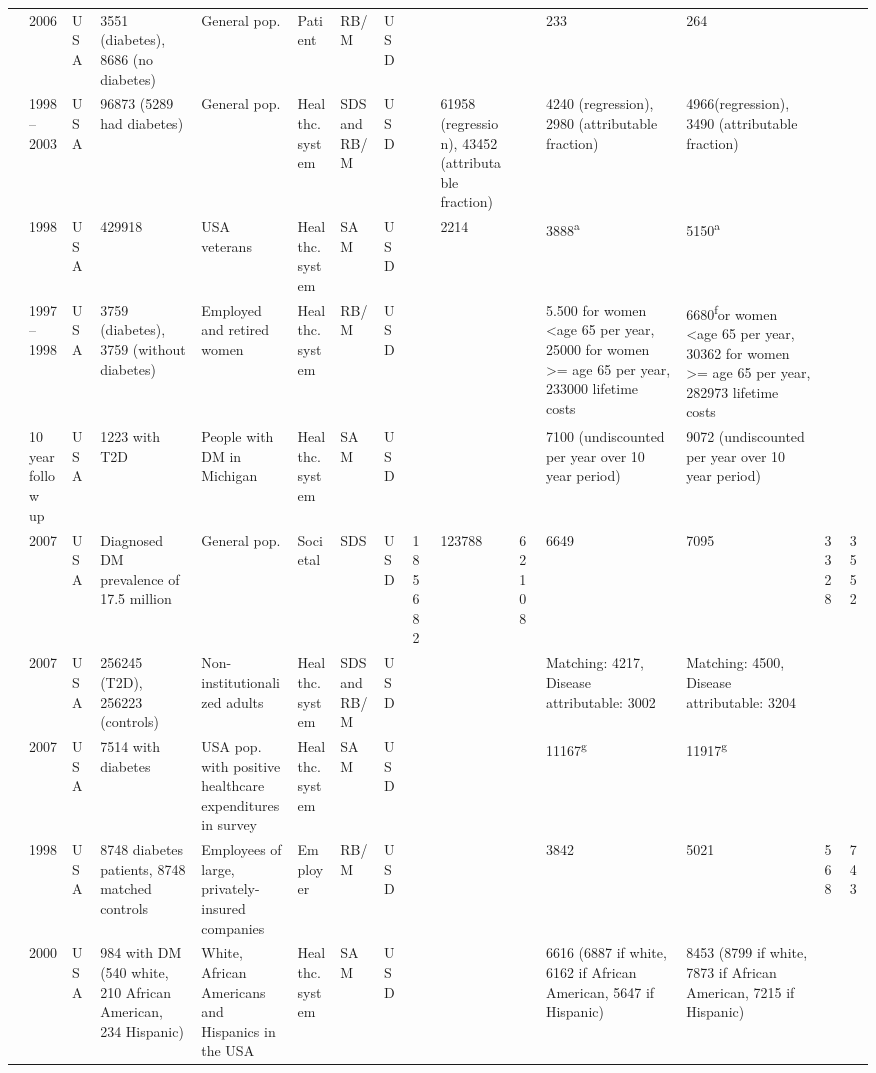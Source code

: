 \documentclass[12pt,english]{article}
\begin{document}
\begin{appendix}
\begin{landscape}
\begin{tabularx}{\linewidth}{Z X X Z Z X X X X X X X X Y Y}
\textcite{Rodbard2010b} & 2006 & USA & 3551 (diabetes), 8686 (no diabetes) & General pop. & Patient & RB/M & USD &  &  &  & 233 & 264 &  &  \\
\textcite{Honeycutt2009a} & 1998--2003 & USA & 96873 (5289 had diabetes) & General pop. & Healthc. system & SDS and RB/M & USD &  & 61958 (regression), 43452 (attributable   fraction) &  & 4240 (regression), 2980 (attributable   fraction) & 4966(regression), 3490 (attributable   fraction) &  &  \\
\textcite{Maciejewski2004} & 1998 & USA & 429918 & USA veterans & Healthc. system & SAM & USD &  & 2214 &  & 3888\textsuperscript{a} & 5150\textsuperscript{a} &  &  \\
\textcite{Birnbaum2003c} & 1997--1998 & USA & 3759 (diabetes), 3759 (without diabetes) & Employed and retired women & Healthc. system & RB/M & USD &  &  &  & 5.500 for women \textless age 65 per year, 25000   for women \textgreater= age 65 per year, 233000 lifetime costs & 6680\textsuperscript{f}or women \textless age 65 per year, 30362   for women \textgreater= age 65 per year, 282973 lifetime costs &  &  \\
\textcite{Zhou2005a} & 10 year follow up & USA & 1223 with T2D & People with DM in Michigan & Healthc. system & SAM & USD &  &  &  & 7100 (undiscounted per year over 10 year   period) & 9072 (undiscounted per year over 10 year   period) &  &  \\
\textcite{AmericalDiabetesAssociation2008} & 2007 & USA & Diagnosed DM prevalence of 17.5 million & General pop. & Societal & SDS & USD & 185682 & 123788 & 62108 & 6649 & 7095 & 3328 & 3552 \\
\textcite{Tunceli2010c} & 2007 & USA & 256245 (T2D), 256223 (controls) & Non-institutionalized adults & Healthc. system & SDS and RB/M & USD &  &  &  & Matching: 4217, Disease attributable: 3002 & Matching: 4500, Disease attributable: 3204 &  &  \\
\textcite{Condliffe2013} & 2007 & USA & 7514 with diabetes & USA pop. with positive healthcare   expenditures in survey & Healthc. system & SAM & USD &  &  &  & 11167\textsuperscript{g} & 11917\textsuperscript{g} &  &  \\
\textcite{Ramsey2002a} & 1998 & USA & 8748 diabetes patients, 8748 matched   controls & Employees of large, privately-insured   companies & Employer & RB/M & USD &  &  &  & 3842 & 5021 & 568 & 743 \\
\textcite{Lee2006} & 2000 & USA & 984 with DM (540 white, 210 African   American, 234 Hispanic) & White, African Americans and Hispanics in   the USA & Healthc. system & SAM & USD &  &  &  & 6616 (6887 if white, 6162 if African   American, 5647 if Hispanic) & 8453 (8799 if white, 7873 if African   American, 7215 if Hispanic) &  &  \\

\end{tabularx}
\end{landscape}
\end{appendix}
\end{document}
